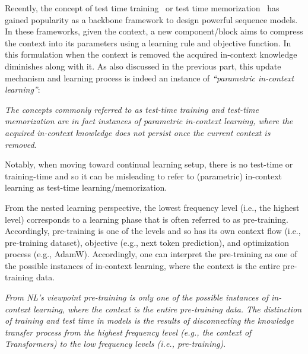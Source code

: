 \documentclass{article}
\newcommand{\citep}{\parencite}
\newcommand{\headred}[1]{\vspace{1.7mm}\noindent{{\textcolor{c5}{\bf #1.}}}}
\begin{document}
{\headred{(Test-Time) Learning/Memorization}
Recently, the concept of test time training~\citep{sun2024learning, wang2025test} or test time memorization~\citep{behrouz2025Miras} has gained popularity as a backbone framework to design powerful sequence models. In these frameworks, given the context, a new component/block aims to compress the context into its parameters using a learning rule and objective function. In this formulation when the context is removed the acquired in-context knowledge diminishes along with it. As also discussed in the previous part, this update mechanism and learning process is indeed an instance of \emph{``parametric in-context learning''}:  

\begin{myboxismall}
    \textit{The concepts commonly referred to as test-time training and test-time memorization are in fact instances of parametric in-context learning, where the acquired in-context knowledge does not persist once the current context is removed}. 
\end{myboxismall}

Notably, when moving toward continual learning setup, there is no test-time or training-time and so it can be misleading to refer to (parametric) in-context learning as test-time learning/memorization. 

\headred{Pre-training and Test Time}
From the nested learning perspective, the lowest frequency level (i.e., the highest level) corresponds to a learning phase that is often referred to as pre-training. Accordingly, pre-training is one of the levels and so has its own context flow (i.e., pre-training dataset), objective (e.g., next token prediction), and optimization process (e.g., AdamW). Accordingly, one can interpret the pre-training as one of the possible instances of in-context learning, where the context is the entire pre-training data. 

\begin{myboxismall}  
    \textit{From NL's viewpoint pre-training is only one of the possible instances of in-context learning, where the context is the entire pre-training data. The distinction of training and test time in models is the results of disconnecting the knowledge transfer process from the highest frequency level (e.g., the context of Transformers) to the low frequency levels (i.e., pre-training)}.
\end{myboxismall}

}
\end{document}
